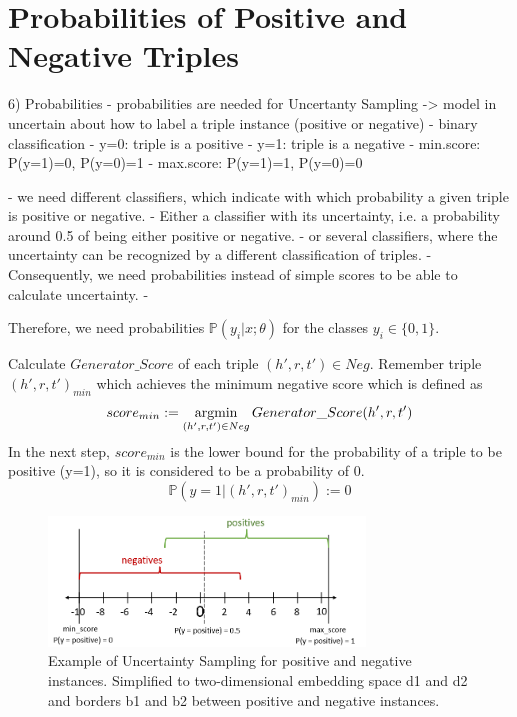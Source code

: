 \section{Probabilities of Positive and Negative Triples} 
\label{sec:probabilities}


6) Probabilities 
- probabilities are needed for Uncertanty Sampling 
-> model in uncertain about how to label a triple instance (positive or negative)
- binary classification
- y=0: triple is a positive
- y=1: triple is a negative
- min.score: P(y=1)=0, P(y=0)=1 
- max.score: P(y=1)=1, P(y=0)=0

- we need different classifiers, which indicate with which probability a given triple is positive or negative.
- Either a classifier with its uncertainty, i.e. a probability around 0.5 of being either positive or negative.
- or several classifiers, where the uncertainty can be recognized by a different classification of triples. 
- Consequently, we need probabilities instead of simple scores to be able to calculate uncertainty.
- 

Therefore, we need probabilities $\mathds{P}(y_i | x; \theta)$ for the classes $y_i \in \{0, 1\}$.

Calculate $Generator\_Score$ of each triple $(h',r,t') \in Neg$.
Remember triple $(h',r,t')_{min}$ which achieves the minimum negative score which is defined as
\begin{equation}
    score_{min} := \operatorname*{argmin}_{(h', r, t') \in Neg}{Generator\_Score(h', r, t')}
\end{equation}
In the next step, $score_{min}$ is the lower bound for the probability of a triple to be positive (y=1), so it is considered to be a probability of 0.
\begin{equation}
    \mathds{P}(y = 1|(h', r, t')_{min}) := 0
\end{equation}

\begin{figure}[t]
  \centering
    \includegraphics[width=0.75\textwidth]{figures/positives_negatives1.PNG}
  \caption{Example of Uncertainty Sampling for positive and negative instances. Simplified to two-dimensional embedding space d1 and d2 and borders b1 and b2 between positive and negative instances.}
  \label{fig:informativeinstances}
\end{figure}


